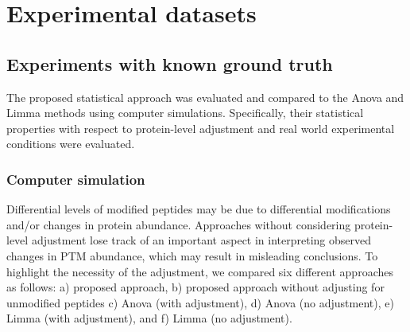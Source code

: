 \documentclass{mcp}
\begin{document}

\clearpage
\section{Experimental datasets}
\label{sec:experiments}
\subsection{Experiments with known ground truth}
\label{sec:sim}

The proposed statistical approach was evaluated and compared to the Anova and Limma methods using computer simulations. Specifically, their statistical properties with respect to protein-level adjustment and real world experimental conditions were evaluated.


\subsubsection{Computer simulation}
\label{sec:comp_sim}
Differential levels of modified peptides may be due to differential modifications and/or changes in protein abundance. Approaches without considering protein-level adjustment lose track of an important aspect in interpreting observed changes in PTM abundance, which may result in misleading conclusions. To highlight the necessity of the adjustment, we compared six different approaches as follows: a) proposed approach, b) proposed approach without adjusting for unmodified peptides c) Anova (with adjustment), d) Anova (no adjustment), e) Limma (with adjustment), and f) Limma (no adjustment).
\end{document}
